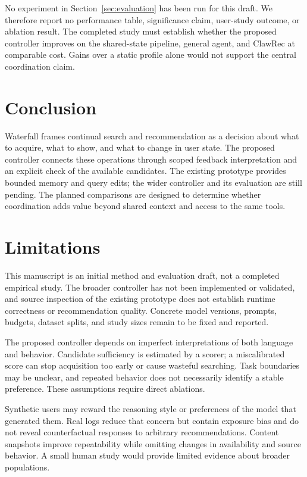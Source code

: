 \documentclass[11pt]{article}
\begin{document}
No experiment in Section~\ref{sec:evaluation} has been run for this draft. We therefore report no performance table, significance claim, user-study outcome, or ablation result. The completed study must establish whether the proposed controller improves on the shared-state pipeline, general agent, and ClawRec at comparable cost. Gains over a static profile alone would not support the central coordination claim.

\section{Conclusion}

Waterfall frames continual search and recommendation as a decision about what to acquire, what to show, and what to change in user state. The proposed controller connects these operations through scoped feedback interpretation and an explicit check of the available candidates. The existing prototype provides bounded memory and query edits; the wider controller and its evaluation are still pending. The planned comparisons are designed to determine whether coordination adds value beyond shared context and access to the same tools.

\section*{Limitations}

This manuscript is an initial method and evaluation draft, not a completed empirical study. The broader controller has not been implemented or validated, and source inspection of the existing prototype does not establish runtime correctness or recommendation quality. Concrete model versions, prompts, budgets, dataset splits, and study sizes remain to be fixed and reported.

The proposed controller depends on imperfect interpretations of both language and behavior. Candidate sufficiency is estimated by a scorer; a miscalibrated score can stop acquisition too early or cause wasteful searching. Task boundaries may be unclear, and repeated behavior does not necessarily identify a stable preference. These assumptions require direct ablations.

Synthetic users may reward the reasoning style or preferences of the model that generated them. Real logs reduce that concern but contain exposure bias and do not reveal counterfactual responses to arbitrary recommendations. Content snapshots improve repeatability while omitting changes in availability and source behavior. A small human study would provide limited evidence about broader populations.
\end{document}

